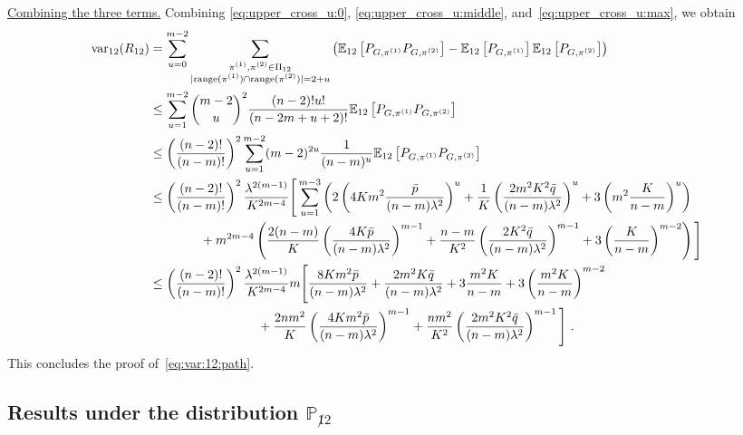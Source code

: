 \documentclass[final]{colt2026}
\newcommand{\1}{\mathbf{1}}
\newcommand{\bbE}{\mathbb{E}}
\newcommand{\bbP}{\mathbb{P}}
\newcommand{\pa}[1]{\left(#1\right)}
\newcommand{\cro}[1]{\left[#1\right]}
\begin{document}
\noindent\underline{Combining the three terms.}
Combining \eqref{eq:upper_cross_u:0}, \eqref{eq:upper_cross_u:middle}, and~\eqref{eq:upper_cross_u:max}, we obtain 
\begin{align*}
\text{var}_{12}(R_{12}) &= \sum_{u=0}^{m-2} \sum_{\substack{\pi^{(1)},\pi^{(2)}\in \Pi_{12}\\ |\text{range}(\pi^{(1)})\cap \text{range}(\pi^{(2)})|=2+u}}
\pa{\bbE_{12}\cro{P_{G,\pi^{(1)}}P_{G,\pi^{(2)}}}-\bbE_{12}\cro{P_{G,\pi^{(1)}}}\bbE_{12}\cro{P_{G,\pi^{(2)}}}}\\
& \leq   \sum_{u=1}^{m-2}   \binom{m-2}{u}^{2} {(n-2)!u!\over (n-2m+u+2)!}  \bbE_{12}\cro{P_{G,\pi^{(1)}}P_{G,\pi^{(2)}}}\\
&\leq \left(\frac{(n-2)!}{(n-m)!}\right)^2\sum_{u=1}^{m-2} (m-2)^{2u}  \frac{1}{(n-m)^u}\bbE_{12}\cro{P_{G,\pi^{(1)}}P_{G,\pi^{(2)}}} \\ 
&\leq \left(\frac{(n-2)!}{(n-m)!}\right)^2 \frac{\lambda^{2(m-1)}}{K^{2m-4}}\Bigg[\sum_{u=1}^{m-3} \left( 2\left(4Km^2\frac{\bar p}{ (n-m) \lambda^2}\right)^{u}+  \frac{1}{K}\left(\frac{2m^2K^2\bar{q}}{(n-m) \lambda^2} \right)^{u} + 3\left(m^2\frac{K}{n-m}\right)^u \right)   
\\ & \quad \quad\quad \quad  + m^{2m-4}\left( \frac{2(n-m)}{K} \left(\frac{4K\bar p}{(n-m)\lambda^2}\right)^{m-1}+ \frac{n-m}{K^2}\left(\frac{2K^2\bar{q}}{(n-m)\lambda^2} \right)^{m-1} + 3\left(\frac{K}{n-m}\right)^{m-2}\right)\Bigg]\\
&\leq \left(\frac{(n-2)!}{(n-m)!}\right)^2  \frac{\lambda^{2(m-1)}}{K^{2m-4}}m \Bigg[\frac{8Km^2 \bar p}{ (n-m) \lambda^2}+  \frac{2m^2K\bar{q}}{(n-m) \lambda^2} + 3\frac{m^2 K}{n-m}+ 3\left(\frac{m^2 K}{n-m}\right)^{m-2}\\ &\hspace{3cm} +  \frac{2nm^2}{K} \left(\frac{4Km^2\bar p}{(n-m)\lambda^2}\right)^{m-1} + \frac{n m^2}{K^2}\left(\frac{2m^2K^2\bar{q}}{(n-m)\lambda^2} \right)^{m-1}
\Bigg] \ . 
\end{align*}
This concludes the proof of~\eqref{eq:var:12:path}.


\subsection{Results under the distribution $\bbP_{\not 12}$}
\end{document}
